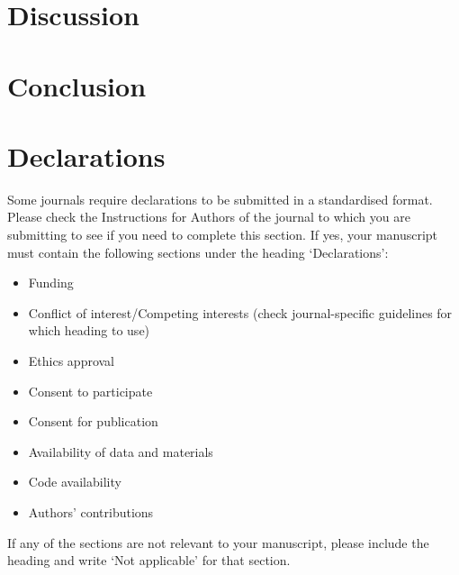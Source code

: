 \documentclass[sn-basic,Numbered,pdflatex]{sn-jnl}
\theoremstyle{remark}
\theoremstyle{definition}
\providecommand{\tightlist}{%
  \setlength{\itemsep}{0pt}\setlength{\parskip}{0pt}}
\begin{document}
\hypertarget{sec12}{%
\section{Discussion}\label{sec12}}

\hypertarget{sec13}{%
\section{Conclusion}\label{sec13}}

\backmatter



\hypertarget{declarations}{%
\section*{Declarations}\label{declarations}}

Some journals require declarations to be submitted in a standardised
format. Please check the Instructions for Authors of the journal to
which you are submitting to see if you need to complete this section. If
yes, your manuscript must contain the following sections under the
heading `Declarations':

\begin{itemize}
\tightlist
\item
  Funding
\item
  Conflict of interest/Competing interests (check journal-specific
  guidelines for which heading to use)
\item
  Ethics approval
\item
  Consent to participate
\item
  Consent for publication
\item
  Availability of data and materials
\item
  Code availability
\item
  Authors' contributions
\end{itemize}

\noindent If any of the sections are not relevant to your manuscript,
please include the heading and write `Not applicable' for that section.


\end{document}
